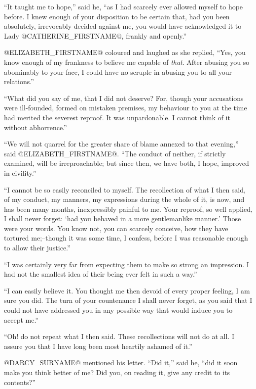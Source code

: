 ``It taught me to hope,'' said he, ``as I had scarcely ever allowed myself
to hope before. I knew enough of your disposition to be certain that,
had you been absolutely, irrevocably decided against me, you would have
acknowledged it to Lady @CATHERINE_FIRSTNAME@, frankly and openly.''

@ELIZABETH_FIRSTNAME@ coloured and laughed as she replied, ``Yes, you know enough
of my frankness to believe me capable of \textit{that}. After abusing you so
abominably to your face, I could have no scruple in abusing you to all
your relations.''

``What did you say of me, that I did not deserve? For, though your
accusations were ill-founded, formed on mistaken premises, my
behaviour to you at the time had merited the severest reproof. It was
unpardonable. I cannot think of it without abhorrence.''

``We will not quarrel for the greater share of blame annexed to that
evening,'' said @ELIZABETH_FIRSTNAME@. ``The conduct of neither, if strictly examined,
will be irreproachable; but since then, we have both, I hope, improved
in civility.''

``I cannot be so easily reconciled to myself. The recollection of what I
then said, of my conduct, my manners, my expressions during the whole of
it, is now, and has been many months, inexpressibly painful to me. Your
reproof, so well applied, I shall never forget: `had you behaved in a
more gentlemanlike manner.' Those were your words. You know not, you can
scarcely conceive, how they have tortured me;--though it was some time,
I confess, before I was reasonable enough to allow their justice.''

``I was certainly very far from expecting them to make so strong an
impression. I had not the smallest idea of their being ever felt in such
a way.''

``I can easily believe it. You thought me then devoid of every proper
feeling, I am sure you did. The turn of your countenance I shall never
forget, as you said that I could not have addressed you in any possible
way that would induce you to accept me.''

``Oh! do not repeat what I then said. These recollections will not do at
all. I assure you that I have long been most heartily ashamed of it.''

@DARCY_SURNAME@ mentioned his letter. ``Did it,'' said he, ``did it soon make you
think better of me? Did you, on reading it, give any credit to its
contents?''

